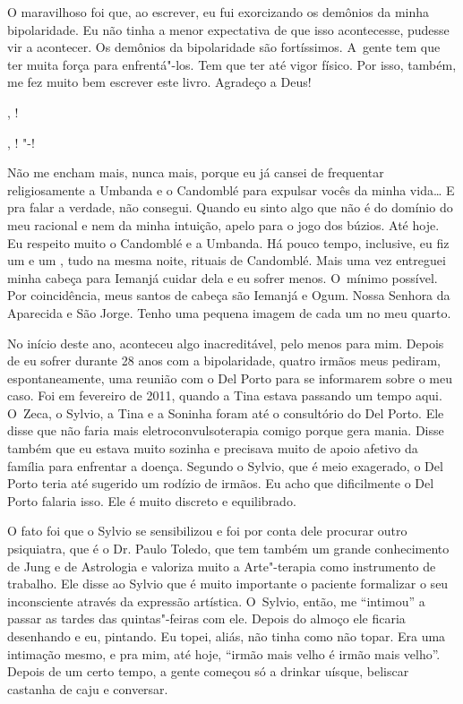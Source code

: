 O maravilhoso foi que, ao escrever, eu fui exorcizando os demônios da
minha bipolaridade. Eu não tinha a menor expectativa de que isso
acontecesse, pudesse vir a acontecer. Os demônios da bipolaridade são
fortíssimos. A~gente tem que ter muita força para enfrentá"-los. Tem que
ter até vigor físico. Por isso, também, me fez muito bem escrever este
livro. Agradeço a Deus!

, !

, ! "-!

Não me encham mais, nunca mais, porque eu já cansei de frequentar
religiosamente a Umbanda e o Candomblé para expulsar vocês da minha
vida… E pra falar a verdade, não consegui. Quando eu sinto algo
que não é do domínio do meu racional e nem da minha intuição, apelo para
o jogo dos búzios. Até hoje. Eu respeito muito o Candomblé e a Umbanda.
Há pouco tempo, inclusive, eu fiz um  e um , tudo na mesma noite,
rituais de Candomblé. Mais uma vez entreguei minha cabeça para Iemanjá
cuidar dela e eu sofrer menos. O~mínimo possível. Por coincidência, meus
santos de cabeça são Iemanjá e Ogum. Nossa Senhora da Aparecida e São
Jorge. Tenho uma pequena imagem de cada um no meu quarto.

No início deste ano, aconteceu algo inacreditável, pelo menos para mim.
Depois de eu sofrer durante 28 anos com a bipolaridade, quatro irmãos
meus pediram, espontaneamente, uma reunião com o Del Porto para se
informarem sobre o meu caso. Foi em fevereiro de 2011, quando a Tina
estava passando um tempo aqui. O~Zeca, o Sylvio, a Tina e a Soninha
foram até o consultório do Del Porto. Ele disse que não faria mais
eletroconvulsoterapia comigo porque gera mania. Disse também que eu
estava muito sozinha e precisava muito de apoio afetivo da família para
enfrentar a doença. Segundo o Sylvio, que é meio exagerado, o Del Porto
teria até sugerido um rodízio de irmãos. Eu acho que dificilmente o Del
Porto falaria isso. Ele é muito discreto e equilibrado.

O fato foi que o Sylvio se sensibilizou e foi por conta dele procurar
outro psiquiatra, que é o Dr. Paulo Toledo, que tem também um grande
conhecimento de Jung e de Astrologia e valoriza muito a Arte"-terapia
como instrumento de trabalho. Ele disse ao Sylvio que é muito importante
o paciente formalizar o seu inconsciente através da expressão artística.
O~Sylvio, então, me ``intimou'' a passar as tardes das quintas"-feiras
com ele. Depois do almoço ele ficaria desenhando e eu, pintando. Eu
topei, aliás, não tinha como não topar. Era uma intimação mesmo, e pra
mim, até hoje, ``irmão mais velho é irmão mais velho''. Depois de
um certo tempo, a gente começou só a drinkar uísque, beliscar castanha
de caju e conversar.

